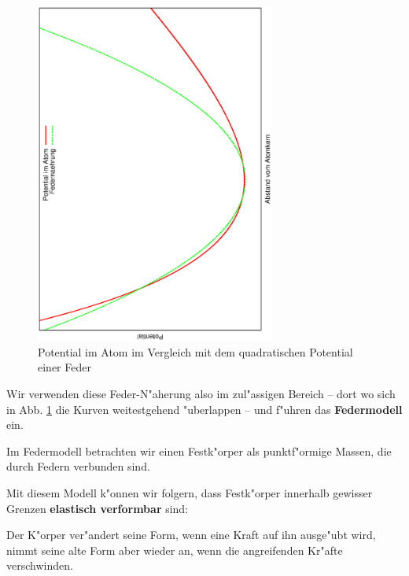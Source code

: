 \begin{figure}
   \centering
   \includegraphics[width=0.7\textwidth,angle=-90]{bilder/atompot}
   \caption[Potentiale: Atomar, Feder]{Potential im Atom im Vergleich
     mit dem quadratischen Potential einer Feder}
   \label{abb_atompotential-federpotential}
\end{figure}

Wir verwenden diese Feder-N"aherung also im zul"assigen Bereich -- dort
wo sich in Abb. \ref{abb_atompotential-federpotential} die Kurven
weitestgehend "uberlappen -- und f"uhren das \textbf{Federmodell} ein.


\begin{Def}
Im Federmodell betrachten wir einen Festk"orper als punktf"ormige
Massen, die durch Federn verbunden sind.
\end{Def}



Mit diesem Modell k"onnen wir folgern, dass Festk"orper innerhalb
gewisser Grenzen \textbf{elastisch verformbar} sind:
\begin{Def}
Der K"orper ver"andert seine Form, wenn eine Kraft auf ihn ausge"ubt
wird, nimmt seine alte Form aber wieder an, wenn die angreifenden
Kr"afte verschwinden.
\end{Def}

